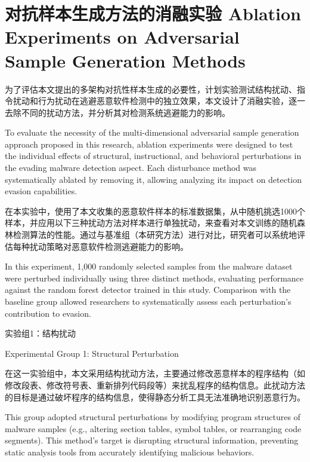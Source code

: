 
\section{对抗样本生成方法的消融实验 Ablation Experiments on Adversarial Sample Generation Methods}

为了评估本文提出的多架构对抗性样本生成的必要性，计划实验测试结构扰动、指令扰动和行为扰动在逃避恶意软件检测中的独立效果，本文设计了消融实验，逐一去除不同的扰动方法，并分析其对检测系统逃避能力的影响。

To evaluate the necessity of the multi-dimensional adversarial sample generation approach proposed in this research, ablation experiments were designed to test the individual effects of structural, instructional, and behavioral perturbations in the evading malware detection aspect. Each disturbance method was systematically ablated by removing it, allowing analyzing its impact on detection evasion capabilities.

在本实验中，使用了本文收集的恶意软件样本的标准数据集，从中随机挑选1000个样本，并应用以下三种扰动方法对样本进行单独扰动，来查看对本文训练的随机森林检测算法的性能。通过与基准组（本研究方法）进行对比，研究者可以系统地评估每种扰动策略对恶意软件检测逃避能力的影响。

In this experiment, 1,000 randomly selected samples from the malware dataset were perturbed individually using three distinct methods, evaluating performance against the random forest detector trained in this study. Comparison with the baseline group allowed researchers to systematically assess each perturbation's contribution to evasion.

实验组1：结构扰动

Experimental Group 1: Structural Perturbation

在这一实验组中，本文采用结构扰动方法，主要通过修改恶意样本的程序结构（如修改段表、修改符号表、重新排列代码段等）来扰乱程序的结构信息。此扰动方法的目标是通过破坏程序的结构信息，使得静态分析工具无法准确地识别恶意行为。

This group adopted structural perturbations by modifying program structures of malware samples (e.g., altering section tables, symbol tables, or rearranging code segments). This method's target is disrupting structural information, preventing static analysis tools from accurately identifying malicious behaviors.

